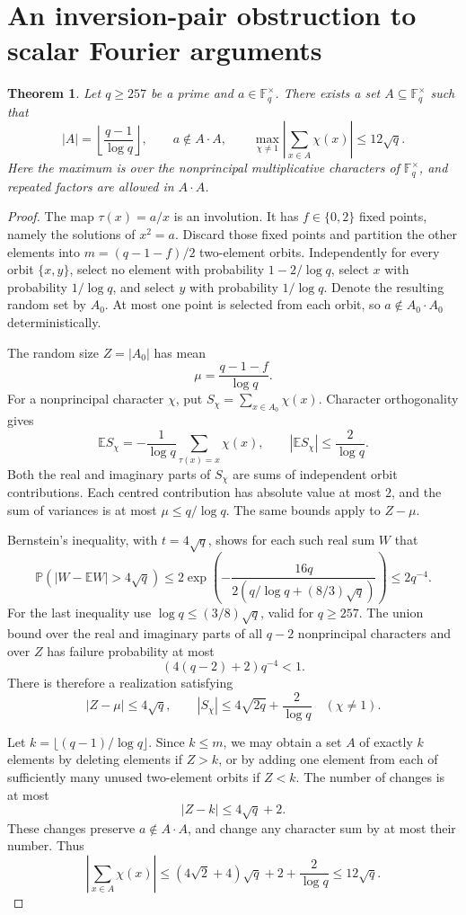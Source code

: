 \documentclass[11pt,a4paper]{article}
\newtheorem{theorem}{Theorem}[section]
\theoremstyle{definition}
\theoremstyle{remark}
\begin{document}
\section{An inversion-pair obstruction to scalar Fourier arguments}

\begin{theorem}\label{p-thm:inversion-countermodel}
Let $q\ge257$ be a prime and $a\in\mathbb F_q^\times$.
There exists a set $A\subseteq\mathbb F_q^\times$ such that
\[
 |A|=\left\lfloor\frac{q-1}{\log q}\right\rfloor,
 \qquad a\notin A\cdot A,
 \qquad
 \max_{\chi\ne1}\left|\sum_{x\in A}\chi(x)\right|
 \le12\sqrt q.
\]
Here the maximum is over the nonprincipal multiplicative characters
of $\mathbb F_q^\times$, and repeated factors are allowed in $A\cdot A$.
\end{theorem}

\begin{proof}
The map $\tau(x)=a/x$ is an involution.  It has $f\in\{0,2\}$ fixed
points, namely the solutions of $x^2=a$.  Discard those fixed points and
partition the other elements into $m=(q-1-f)/2$ two-element orbits.
Independently for every orbit $\{x,y\}$, select no element with probability
$1-2/\log q$, select $x$ with probability $1/\log q$, and select $y$
with probability $1/\log q$.  Denote the resulting random set by $A_0$.
At most one point is selected from each orbit, so
$a\notin A_0\cdot A_0$ deterministically.

The random size $Z=|A_0|$ has mean
\[
 \mu=\frac{q-1-f}{\log q}.
\]
For a nonprincipal character $\chi$, put $S_\chi=\sum_{x\in A_0}\chi(x)$.
Character orthogonality gives
\[
 \mathbb E S_\chi
 =-\frac1{\log q}\sum_{\tau(x)=x}\chi(x),
 \qquad |\mathbb E S_\chi|\le\frac2{\log q}.
\]
Both the real and imaginary parts of $S_\chi$ are sums of independent
orbit contributions.  Each centred contribution has absolute value at
most $2$, and the sum of variances is at most
$\mu\le q/\log q$.  The same bounds apply to $Z-\mu$.

Bernstein's inequality, with $t=4\sqrt q$, shows for each such real
sum $W$ that
\[
 \mathbb P(|W-\mathbb EW|>4\sqrt q)
 \le2\exp\!\left(-\frac{16q}{2(q/\log q+(8/3)\sqrt q)}\right)
 \le2q^{-4}.
\]
For the last inequality use
$\log q\le(3/8)\sqrt q$, valid for $q\ge257$.
The union bound over the real and imaginary parts of all $q-2$
nonprincipal characters and over $Z$ has failure probability at most
\[
 (4(q-2)+2)q^{-4}<1.
\]
There is therefore a realization satisfying
\[
 |Z-\mu|\le4\sqrt q,
 \qquad
 |S_\chi|\le4\sqrt{2q}+\frac2{\log q}
 \quad(\chi\ne1).
\]

Let $k=\lfloor(q-1)/\log q\rfloor$.  Since $k\le m$, we may obtain
a set $A$ of exactly $k$ elements by deleting elements if $Z>k$, or by
adding one element from each of sufficiently many unused two-element
orbits if $Z<k$.  The number of changes is at most
\[
 |Z-k|\le4\sqrt q+2.
\]
These changes preserve $a\notin A\cdot A$, and change any character sum
by at most their number.  Thus
\[
 \left|\sum_{x\in A}\chi(x)\right|
 \le(4\sqrt2+4)\sqrt q+2+\frac2{\log q}
 \le12\sqrt q.
\]
\end{proof}
\end{document}
